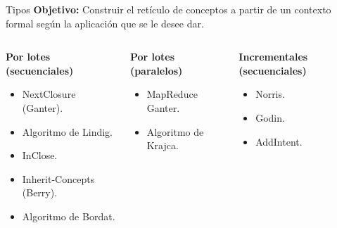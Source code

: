 \documentclass{beamer}
\begin{document}
    \begin{frame}{Tipos}
    \justify
      \textbf{Objetivo:} Construir el retículo de conceptos a partir de un contexto formal según la aplicación que se le desee dar.
       \pause
        \begin{columns}[c]
          \begin{column}{0.35\textwidth}
            \begin{center}
                \begin{block}{\textbf{Por lotes (secuenciales)}}
                \begin{itemize}
                    \item NextClosure (Ganter).
                    \item Algoritmo de Lindig.
                    \item InClose.
                    \item Inherit-Concepts (Berry).
                    \item Algoritmo de Bordat.
                \end{itemize}
                \end{block}
            \end{center}
        \end{column}
        

          
        \begin{column}{0.29\textwidth}
            \begin{center}
            \begin{block}{\textbf{Por lotes (paralelos)}}
                \begin{itemize}
                    \item MapReduce Ganter.
                    \item Algoritmo de Krajca.
                \end{itemize}
            \end{block}
            \end{center}
        \end{column}
        
        \pause
        \begin{column}{0.29\textwidth}
            \begin{center}
            \begin{block}{\textbf{Incrementales (secuenciales)}}
                \begin{itemize}
                    \item Norris.
                    \item Godin.
                    \item AddIntent.
                \end{itemize}
            \end{block}
            \end{center}
        \end{column}
          

\end{columns}
\end{frame}
\end{document}
